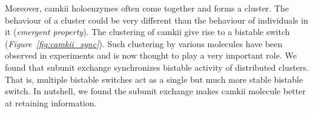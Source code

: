 \documentclass[]{resonance}
\newcommand\Fig[1]{\textit{Figure~\ref{#1}}}
\begin{document}
Moreover, \gls{camkii} holoenzymes often come together and forms a cluster. The
behaviour of a cluster could be very different than the behaviour of individuals
in it (\emph{emergent property}).  The clustering of
\gls{camkii} give rise to a bistable switch (\Fig{fig:camkii_sync}). Such
clustering by various molecules have been observed in experiments and is now
thought to play a very important role. We found that subunit exchange
synchronizes bistable activity of distributed clusters. That is, multiple
bistable switches act as a single but much more stable bistable switch. In
nutshell, we found the subunit exchange makes \gls{camkii} molecule better at
retaining information.
\end{document}
